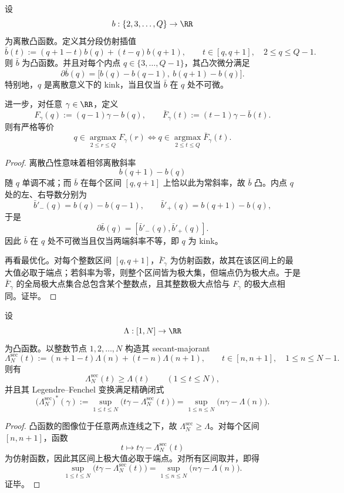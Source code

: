 \begin{theorem}\label{thm:conclusion-discrete-kink-fan-piecewise-linearization}
设
\[
b:\{2,3,\dots,Q\}\to\RR
\]
为离散凸函数。定义其分段仿射插值
\[
\bar b(t):=(q+1-t)b(q)+(t-q)b(q+1),
\qquad
t\in[q,q+1],\quad 2\le q\le Q-1.
\]
则 \(\bar b\) 为凸函数。并且对每个内点 \(q\in\{3,\dots,Q-1\}\)，其凸次微分满足
\[
\partial \bar b(q)=\bigl[b(q)-b(q-1),\ b(q+1)-b(q)\bigr].
\]
特别地，\(q\) 是离散意义下的 kink，当且仅当 \(\bar b\) 在 \(q\) 处不可微。

进一步，对任意 \(\gamma\in\RR\)，定义
\[
F_\gamma(q):=(q-1)\gamma-b(q),
\qquad
\bar F_\gamma(t):=(t-1)\gamma-\bar b(t).
\]
则有严格等价
\[
q\in \operatorname*{argmax}_{2\le r\le Q}F_\gamma(r)
\iff
q\in \operatorname*{argmax}_{2\le t\le Q}\bar F_\gamma(t).
\]
\end{theorem}
\begin{proof}
离散凸性意味着相邻离散斜率
\[
b(q+1)-b(q)
\]
随 \(q\) 单调不减；而 \(\bar b\) 在每个区间 \([q,q+1]\) 上恰以此为常斜率，故 \(\bar b\) 凸。内点 \(q\) 处的左、右导数分别为
\[
\bar b'_-(q)=b(q)-b(q-1),
\qquad
\bar b'_+(q)=b(q+1)-b(q),
\]
于是
\[
\partial\bar b(q)=[\bar b'_-(q),\bar b'_+(q)].
\]
因此 \(\bar b\) 在 \(q\) 处不可微当且仅当两端斜率不等，即 \(q\) 为 kink。

再看最优化。对每个整数区间 \([q,q+1]\)，\(\bar F_\gamma\) 为仿射函数，故其在该区间上的最大值必取于端点；若斜率为零，则整个区间皆为极大集，但端点仍为极大点。于是 \(\bar F_\gamma\) 的全局极大点集合总包含某个整数点，且其整数极大点恰与 \(F_\gamma\) 的极大点相同。证毕。
\end{proof}

\begin{theorem}\label{thm:conclusion-continuous-pressure-secant-majorant-discrete-legendre}
设
\[
\Lambda:[1,N]\to\RR
\]
为凸函数。以整数节点 \(1,2,\dots,N\) 构造其 secant-majorant
\[
\Lambda_N^{\mathrm{sec}}(t):=(n+1-t)\Lambda(n)+(t-n)\Lambda(n+1),
\qquad
t\in[n,n+1],\quad 1\le n\le N-1.
\]
则有
\[
\Lambda_N^{\mathrm{sec}}(t)\ge \Lambda(t)
\qquad
(1\le t\le N),
\]
并且其 Legendre--Fenchel 变换满足精确闭式
\[
\bigl(\Lambda_N^{\mathrm{sec}}\bigr)^\ast(\gamma)
:=
\sup_{1\le t\le N}\bigl(t\gamma-\Lambda_N^{\mathrm{sec}}(t)\bigr)
=
\sup_{1\le n\le N}\bigl(n\gamma-\Lambda(n)\bigr).
\]
\end{theorem}
\begin{proof}
凸函数的图像位于任意两点连线之下，故 \(\Lambda_N^{\mathrm{sec}}\ge\Lambda\)。对每个区间 \([n,n+1]\)，函数
\[
t\longmapsto t\gamma-\Lambda_N^{\mathrm{sec}}(t)
\]
为仿射函数，因此其区间上极大值必取于端点。对所有区间取并，即得
\[
\sup_{1\le t\le N}\bigl(t\gamma-\Lambda_N^{\mathrm{sec}}(t)\bigr)
=
\sup_{1\le n\le N}\bigl(n\gamma-\Lambda(n)\bigr).
\]
证毕。
\end{proof}

